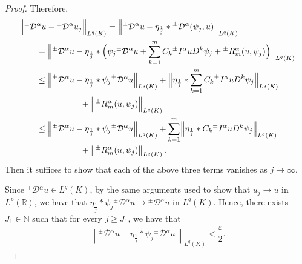 \documentclass[leqno,final]{siamltex}
\numberwithin{equation}{section}
\newcommand{\eps}{\varepsilon}
\renewcommand{\(}{\bigl(}
\renewcommand{\)}{\bigr)}
\newcommand{\R}{\mathbb{R}}
\newcommand{\N}{\mathbb{N}}
\begin{document}
\begin{proof}
            Therefore, 
            \begin{align*}
                & \Bigl\| {^{\pm}}{\mathcal{D}}{^{\alpha}} u - {^{\pm}}{\mathcal{D}}{^{\alpha}} u_j\Bigr\|_{L^{q}(K)} 
                =\Bigl\| {^{\pm}}{\mathcal{D}}{^{\alpha}} u - \eta_{\frac{1}{j}} * {^{\pm}}{\mathcal{D}}{^{\alpha}} (\psi_{j} ,u)\Bigr\|_{L^{q}(K)}\\ 
                &\qquad =\Bigl\|{^{\pm}}{\mathcal{D}}{^{\alpha}} u - \eta_{\frac{1}{j}} * \Bigl( \psi_j {^{\pm}}{\mathcal{D}}{^{\alpha}} u + \sum_{k=1}^{m} C_{k} {^{\pm}}{I}{^{\alpha}} u D^{k} \psi_{j} + {^{\pm}}{R}{^{\alpha}_{m}} (u,\psi_j)\Bigr) \Bigr\|_{L^{q}(K)}\\
                &\qquad \leq \Bigl\|{^{\pm}}{\mathcal{D}}{^{\alpha}} u - \eta_{\frac{1}{j}} * \psi_{j} {^{\pm}}{\mathcal{D}}{^{\alpha}} u \Bigr\|_{L^{q}(K)} + \Bigl\| \eta_{\frac{1}{j}} * \sum_{k=1}^{m} C_{k} {^{\pm}}{I}{^{\alpha}} u D^{k} \psi_{j} \Bigr\|_{L^{q}(K)} \\
                &\hskip 1.0in + \Bigl\| {^{\pm}}{R}{^{\alpha}_{m}} (u,\psi_j) \Bigr\|_{L^{q}(K)}\\
                &\qquad  \leq \Bigl\|{^{\pm}}{\mathcal{D}}{^{\alpha}} u - \eta_{\frac{1}{j}} * \psi_{j} {^{\pm}}{\mathcal{D}}{^{\alpha}} u \Bigr\|_{L^{q}(K)} + \sum_{k=1}^{m} \Bigl\| \eta_{\frac{1}{j}} * C_{k} {^{\pm}}{I}{^{\alpha}} u D^{k} \psi_{j} \Bigr\|_{L^{q}(K)} \\
                &\hskip 1.0in + \left\| {^{\pm}}{R}{^{\alpha}_{m}} (u,\psi_j) \right\|_{L^{q}(K)}.
            \end{align*}
            Then it suffices to show that each of the above three terms vanishes as $j\to \infty$. 
            
            Since ${^{\pm}}{\mathcal{D}}{^{\alpha}} u \in L^{q}(K)$, by the same arguments used 
            to show that $u_j \rightarrow u$ in $L^{p}(\R)$, we have that $\eta_{\frac{1}{j}} * \psi_j {^{\pm}}{\mathcal{D}}{^{\alpha}} u \rightarrow {^{\pm}}{\mathcal{D}}{^{\alpha}} u$ in $L^{q}(K)$. Hence, there exists $J_{1} \in \N$ such that for every $j\geq J_{1}$, we have that 
            \begin{align*}
                \left\| {^{\pm}}{\mathcal{D}}{^{\alpha}} u - \eta_{\frac{1}{j}} * \psi_{j} {^{\pm}}{\mathcal{D}}{^{\alpha}} u \right\|_{L^{q}(K)} < \dfrac{\eps}{2}. 
            \end{align*}


\end{proof}
\end{document}
